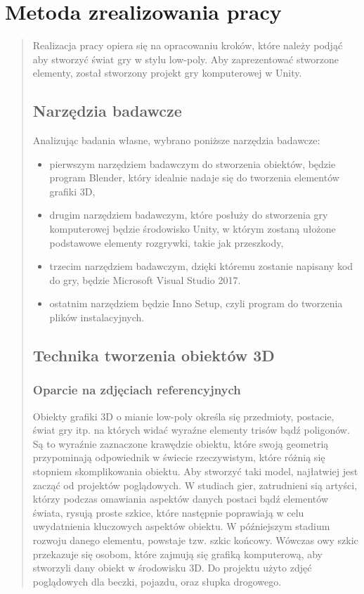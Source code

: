 \chapter{Metoda zrealizowania pracy}
\begin{quotation}
\indent Realizacja pracy opiera się na opracowaniu kroków, które należy podjąć aby stworzyć świat gry w stylu low-poly. Aby zaprezentować stworzone elementy, został stworzony projekt gry komputerowej w Unity.
\section{Narzędzia badawcze}
 Analizując badania własne, wybrano poniższe narzędzia badawcze:
\begin{itemize}
\item pierwszym narzędziem badawczym do stworzenia obiektów, będzie program Blender, który idealnie nadaje się do tworzenia elementów grafiki 3D,

\item drugim narzędziem badawczym, które posłuży do stworzenia gry komputerowej będzie środowisko Unity, w którym zostaną ułożone podstawowe elementy rozgrywki, takie jak przeszkody,

\item trzecim narzędziem badawczym, dzięki któremu zostanie napisany kod do gry, będzie Microsoft Visual Studio 2017.

\item ostatnim narzędziem będzie Inno Setup, czyli program do tworzenia plików instalacyjnych.

\end{itemize}

\section{Technika tworzenia obiektów 3D}
\subsection{Oparcie na zdjęciach referencyjnych}
\indent Obiekty grafiki 3D o mianie low-poly określa się przedmioty, postacie, świat gry itp. na których widać wyraźne elementy trisów bądź poligonów. Są to wyraźnie zaznaczone krawędzie obiektu, które swoją geometrią przypominają odpowiednik w świecie rzeczywistym, które różnią się stopniem skomplikowania obiektu. Aby stworzyć taki model, najłatwiej jest zacząć od projektów poglądowych. W studiach gier, zatrudnieni sią artyści, którzy podczas omawiania aspektów danych postaci bądź elementów świata, rysują proste szkice, które następnie poprawiają w celu uwydatnienia kluczowych aspektów obiektu. 
W późniejszym stadium rozwoju danego elementu, powstaje tzw. szkic końcowy. Wówczas owy szkic przekazuje się osobom, które zajmują się grafiką komputerową, aby stworzyli dany obiekt w środowisku 3D. Do projektu użyto zdjęć poglądowych dla beczki, pojazdu, oraz słupka drogowego.


\end{quotation}
